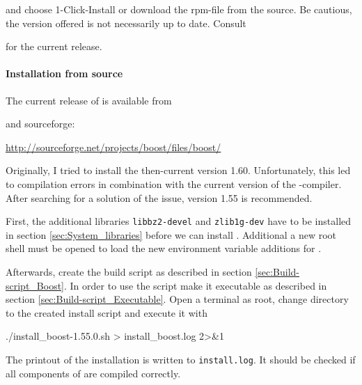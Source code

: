 and choose 1-Click-Install or download the rpm-file from the source. Be cautious, the version offered is not necessarily up to date. Consult

\href{\boostaddress}{\boostaddress}

for the current release.

\paragraph{Installation from source}

The current release of \marktool{\boostname} is available from

\href{\boostaddress}{\boostaddress}

and sourceforge:

\href{http://sourceforge.net/projects/boost/files/boost/}{http://sourceforge.net/projects/boost/files/boost/}

Originally, I tried to install the then-current version 1.60. Unfortunately, this led to compilation errors in combination with the current version of the \marktool{\gccname}-compiler. After searching for a solution of the issue, version 1.55 is recommended.

First, the additional libraries \verb+libbz2-devel+ and \verb+zlib1g-dev+ have to be installed in section \ref{sec:System_libraries} before we can install \marktool{\boostname}. Additional a new root shell must be opened to load the new environment variable additions for \marktool{\openmpiname}.

\begingroup
\lstset{breaklines=true}
\endgroup

Afterwards, create the \marktool{\boostname} build script as described in section \ref{sec:Build-script_Boost}. In order to use the script make it executable as described in section \ref{sec:Build-script_Executable}. Open a terminal as root, change directory to the created install script and execute it with

\begin{code}
./install_boost-1.55.0.sh > install_boost.log 2>&1
\end{code}

The printout of the installation is written to \verb+install.log+. It should be checked if all components of \marktool{\boostname} are compiled correctly.

